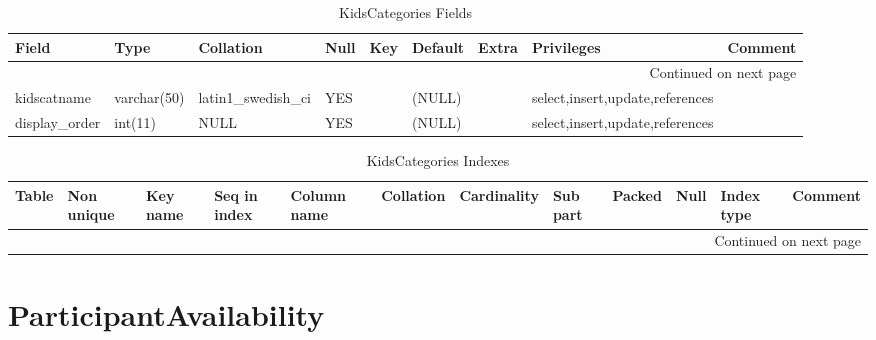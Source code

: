\documentclass[tablesignature,landscape]{scrartcl}
\begin{document}
\begin{longtable}{|l|l|l|l|l|l|l|l|l|}
\caption{KidsCategories Fields} \label{tbl:kidscategoriesfields}\\
\hline
 Field             &  Type         &  Collation                &  Null  &  Key  &  Default  &  Extra              &  Privileges                       &  Comment \\
\hline
\endhead
\hline\multicolumn{9}{r}{Continued on next page}\
\endfoot
\endlastfoot
\hline
 kidscatid         &  int(11)      &  NULL                     &        &  PRI  &  (NULL)   &  auto\_{}increment  &  select,insert,update,references  &           \\
 kidscatname       &  varchar(50)  &  latin1\_{}swedish\_{}ci  &  YES   &       &  (NULL)   &                     &  select,insert,update,references  &           \\
 display\_{}order  &  int(11)      &  NULL                     &  YES   &       &  (NULL)   &                     &  select,insert,update,references  &           \\
\hline
\end{longtable}


\begin{longtable}{|l|l|l|l|l|l|l|l|l|l|l|l|}
\caption{KidsCategories Indexes} \label{tbl:kidscategoriesindexes}\\
\hline
 Table           &  Non unique  &  Key name  &  Seq in index  &  Column name  &  Collation  &  Cardinality  &  Sub part  &  Packed  &  Null  &  Index type  &  Comment \\
\hline
\endhead
\hline\multicolumn{12}{r}{Continued on next page}\
\endfoot
\endlastfoot
\hline
 KidsCategories  &           0  &  PRIMARY   &             1  &  kidscatid    &  A          &            4  &  (NULL)    &  (NULL)  &        &  BTREE       &           \\
\hline
\end{longtable}
\section{ParticipantAvailability}
\label{sec-5}
\end{document}
